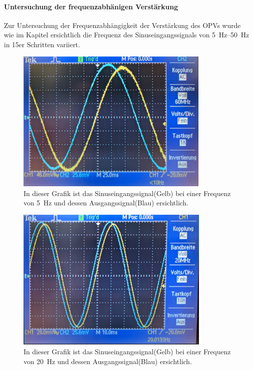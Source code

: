 \documentclass[12pt,english,ngerman]{scrartcl}
\begin{document}

\paragraph{Untersuchung der frequenzabhänigen Verstärkung}
Zur Untersuchung der Frequenzabhängigkeit der Verstärkung des OPVs wurde wie im
Kapitel  ersichtlich die Frequenz des
Sinuseingangssignals von \SIrange{5}{50}{\hertz} in 15er Schritten variiert.

\begin{figure}[H]
  \centering
    \includegraphics[width=\linewidth, height=7cm]{./figures/integrator/5hz.jpg}
    \caption{In dieser Grafik ist das Sinuseingangssignal(Gelb) bei einer Frequenz von
    \SI{5}{\Hz} und dessen Ausgangssignal(Blau) ersichtlich.}
  \label{fig:mess_integrator_5hz}
\end{figure}

\begin{figure}[H]
  \centering
    \includegraphics[width=\linewidth, height=7cm]{./figures/integrator/20hz.jpg}
    \caption{In dieser Grafik ist das Sinuseingangssignal(Gelb) bei einer Frequenz von
    \SI{20}{\Hz} und dessen Ausgangssignal(Blau) ersichtlich.}
  \label{fig:mess_integrator_20hz}
\end{figure}
\end{document}
